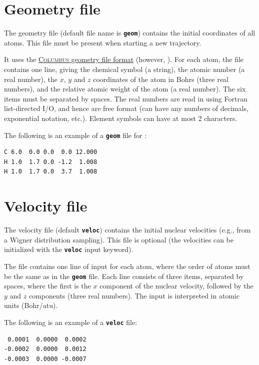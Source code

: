 \documentclass[a4paper,11pt,DIV=15,openany,twoside=false]{scrbook}
\newcommand{\todo}[1]{\textcolor{RL}{#1}}
\newcommand{\ttt}[1]{\textbf{\texttt{#1}}}
\newenvironment{example}{
  \vspace{0mm}
  \definecolor{shadecolor}{HTML}{E4F4FF}
  \begin{shaded}
}{
  \end{shaded}
}
\begin{document}
\section{Geometry file}\label{sec:geomfile}

The geometry file (default file name is \ttt{geom}) contains the initial coordinates of all atoms. This file must be present when starting a new trajectory.

It uses the \href{http://www.univie.ac.at/columbus/docs_COL70/documentation_main.html}{\textsc{Columbus} geometry file format} (however, \todo{}). For each atom, the file contains one line, giving the chemical symbol (a string), the atomic number (a real number), the $x$, $y$ and $z$ coordinates of the atom in Bohrs (three real numbers), and the relative atomic weight of the atom (a real number). The six items must be separated by spaces. The real numbers are read in using Fortran list-directed I/O, and hence are free format (can have any numbers of decimals, exponential notation, etc.). Element symbols can have at most 2 characters.

The following is an example of a \ttt{geom} file for :
\begin{example}
  \begin{verbatim}
C 6.0  0.0 0.0  0.0 12.000
H 1.0  1.7 0.0 -1.2  1.008
H 1.0  1.7 0.0  3.7  1.008
  \end{verbatim}
\end{example}

\section{Velocity file}\label{sec:velocfile}

The velocity file (default \ttt{veloc}) contains the initial nuclear velocities (e.g., from a Wigner distribution sampling). This file is optional (the velocities can be initialized with the \ttt{veloc} input keyword). 

The file contains one line of input for each atom, where the order of atoms must be the same as in the \ttt{geom} file. Each line consists of three items, separated by spaces, where the first is the $x$ component of the nuclear velocity, followed by the $y$ and $z$ components (three real numbers). The input is interpreted in atomic units (Bohr/atu).

The following is an example of a \ttt{veloc} file:
\begin{example}
  \begin{verbatim}
 0.0001  0.0000  0.0002
-0.0002  0.0000  0.0012
-0.0003  0.0000 -0.0007
  \end{verbatim}
\end{example}
\end{document}
